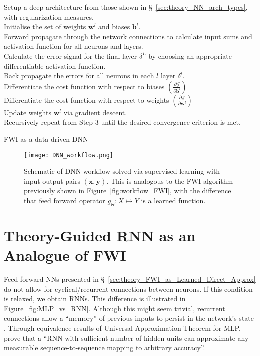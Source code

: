 \begin{algorithm}
Setup a deep architecture from those shown in §~\ref{sec:theory_NN_arch_types}, with regularization measures.\\
Initialise the set of weights $\boldsymbol{w}^l$  and biases $\boldsymbol{b}^l$.\\
Forward propagate through the network connections to calculate input sums and activation function for all neurons and layers.\\
Calculate the error signal for the final layer $\delta^L$ by choosing an appropriate differentiable activation function.\\
Back propagate the errors for all neurons in each $l$ layer $\delta^l$.\\
Differentiate the cost function with respect to biases $\left(\frac{\partial\mathcal{J}}{\partial\boldsymbol{b}^l}\right)$\\
Differentiate the cost function with respect to weights $\left(\frac{\partial\mathcal{J}}{\partial\boldsymbol{w}^l}\right)$\\
Update weights $\boldsymbol{w}^l$ via gradient descent.\\
Recursively repeat from Step 3 until the desired convergence criterion is met.
	\caption{FWI as a data-driven DNN}
	\label{algo:fwi_dnn}
\end{algorithm}

\begin{figure}[ht!]
	\centering
	\texttt{[image: DNN\_workflow.png]}
	\caption[Schematic of DNN workflow]{Schematic of DNN workflow solved via supervised learning with input-output pairs $(\boldsymbol{x}, \boldsymbol{y})$. This is analogous to the FWI algorithm previously shown in Figure~\ref{fig:workflow_FWI}, with the difference that feed forward operator $g_\Theta:X\mapsto Y$ is a learned function.}
	\label{fig:workflow_DNN}
\end{figure}

\section[RNN as an Analogue of FWI]{Theory-Guided RNN as an Analogue of FWI}
Feed forward NNs presented in §~\ref{sec:theory_FWI_as_Learned_Direct_Approx} do not allow for cyclical/recurrent connections between neurons. If this condition is relaxed, we obtain RNNs. This difference is illustrated in Figure~\ref{fig:MLP_vs_RNN}. Although this might seem trivial, recurrent connections allow a ``memory'' of previous inputs to persist in the network’s state \citep{Graves2012}. Through equivalence results of Universal Approximation Theorem for MLP, \cite{Hammer2000} prove that a ``RNN with sufficient number of hidden units can approximate any measurable sequence-to-sequence mapping to arbitrary accuracy''.

